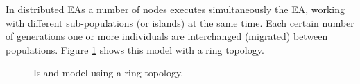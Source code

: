 \documentclass[final,1p,times]{elsarticle}
\begin{document}
In distributed EAs a number of nodes executes simultaneously the EA, working with different sub-populations (or islands) at the same time. Each certain number of generations one or more individuals are interchanged (migrated) between populations. Figure \ref{fig:islands} shows this model with a ring topology.  %






\begin{figure}[htb]
\centering
{}
\caption{Island model using a ring topology.}
\label{fig:islands}
\end{figure}
\end{document}

